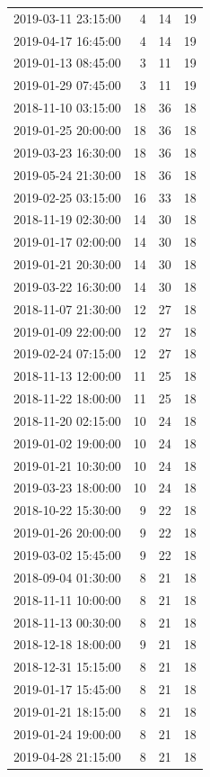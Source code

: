 \begin{tabular}{lrrr}
2019-03-11 23:15:00 & 4 & 14 & 19 \\
2019-04-17 16:45:00 & 4 & 14 & 19 \\
2019-01-13 08:45:00 & 3 & 11 & 19 \\
2019-01-29 07:45:00 & 3 & 11 & 19 \\
2018-11-10 03:15:00 & 18 & 36 & 18 \\
2019-01-25 20:00:00 & 18 & 36 & 18 \\
2019-03-23 16:30:00 & 18 & 36 & 18 \\
2019-05-24 21:30:00 & 18 & 36 & 18 \\
2019-02-25 03:15:00 & 16 & 33 & 18 \\
2018-11-19 02:30:00 & 14 & 30 & 18 \\
2019-01-17 02:00:00 & 14 & 30 & 18 \\
2019-01-21 20:30:00 & 14 & 30 & 18 \\
2019-03-22 16:30:00 & 14 & 30 & 18 \\
2018-11-07 21:30:00 & 12 & 27 & 18 \\
2019-01-09 22:00:00 & 12 & 27 & 18 \\
2019-02-24 07:15:00 & 12 & 27 & 18 \\
2018-11-13 12:00:00 & 11 & 25 & 18 \\
2018-11-22 18:00:00 & 11 & 25 & 18 \\
2018-11-20 02:15:00 & 10 & 24 & 18 \\
2019-01-02 19:00:00 & 10 & 24 & 18 \\
2019-01-21 10:30:00 & 10 & 24 & 18 \\
2019-03-23 18:00:00 & 10 & 24 & 18 \\
2018-10-22 15:30:00 & 9 & 22 & 18 \\
2019-01-26 20:00:00 & 9 & 22 & 18 \\
2019-03-02 15:45:00 & 9 & 22 & 18 \\
2018-09-04 01:30:00 & 8 & 21 & 18 \\
2018-11-11 10:00:00 & 8 & 21 & 18 \\
2018-11-13 00:30:00 & 8 & 21 & 18 \\
2018-12-18 18:00:00 & 9 & 21 & 18 \\
2018-12-31 15:15:00 & 8 & 21 & 18 \\
2019-01-17 15:45:00 & 8 & 21 & 18 \\
2019-01-21 18:15:00 & 8 & 21 & 18 \\
2019-01-24 19:00:00 & 8 & 21 & 18 \\
2019-04-28 21:15:00 & 8 & 21 & 18 \\

\end{tabular}
